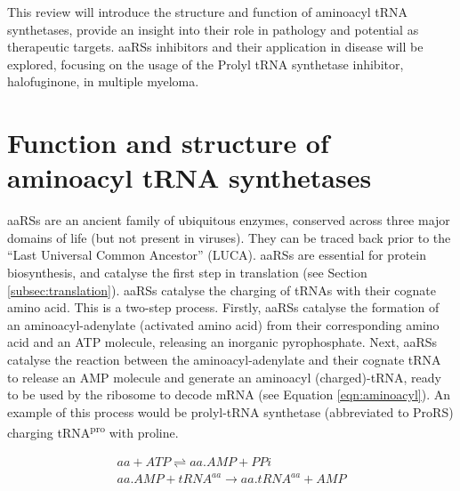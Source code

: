 This review will introduce the structure and function of aminoacyl tRNA synthetases, provide an insight into their role in pathology and potential as therapeutic targets.
aaRSs inhibitors and their application in disease will be explored, focusing on the usage of the Prolyl tRNA synthetase inhibitor, halofuginone, in multiple myeloma.

\section{Function and structure of aminoacyl tRNA synthetases}

aaRSs are an ancient family of ubiquitous enzymes, conserved across three major domains of life (but not present in viruses).
They can be traced back prior to the ``Last Universal Common Ancestor'' (LUCA)\cite{de2020evolution}.
aaRSs are essential for protein biosynthesis, and catalyse the first step in translation (see Section \ref{subsec:translation}).
aaRSs catalyse the charging of tRNAs with their cognate amino acid.
This is a two-step process.
Firstly, aaRSs catalyse the formation of an aminoacyl-adenylate (activated amino acid) from their corresponding amino acid and an ATP molecule, releasing an inorganic pyrophosphate.
Next, aaRSs catalyse the reaction between the aminoacyl-adenylate and their cognate tRNA to release an AMP molecule and generate an aminoacyl (charged)-tRNA, ready to be used by the ribosome to decode mRNA (see Equation \ref{eqn:aminoacyl}).
An example of this process would be prolyl-tRNA synthetase (abbreviated to ProRS) charging tRNA\textsuperscript{pro} with proline.

\begin{equation}\label{eqn:aminoacyl}
\begin{gathered}
aa + ATP \rightleftharpoons  aa.AMP + PPi \\
aa.AMP + tRNA^{aa} \longrightarrow  aa.tRNA^{aa} + AMP
\end{gathered}
\end{equation}

